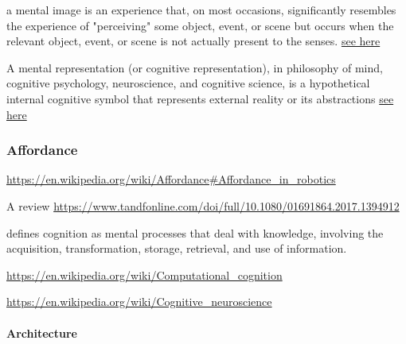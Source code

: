 \documentclass{book}
\newcommand{\seehere}[1]{\href{#1}{see here}}
\providecommand{\seehere}[1]{\href{#1}{see here}}
\begin{document}

a mental image is an experience that, on most occasions, significantly resembles the experience of "perceiving" some object, event, or scene but occurs when the relevant object, event, or scene is not actually present to the senses. \seehere{https://en.wikipedia.org/wiki/Mental_image}


A mental representation (or cognitive representation), in philosophy of mind, cognitive psychology, neuroscience, and cognitive science, is a hypothetical internal cognitive symbol that represents external reality or its abstractions \seehere{https://en.wikipedia.org/wiki/Mental_representation}

\subsubsection{Affordance}


\url{https://en.wikipedia.org/wiki/Affordance\#Affordance_in_robotics}
    
    A review
    \url{https://www.tandfonline.com/doi/full/10.1080/01691864.2017.1394912}


\cite{revlin-2012-cognition-theory-and-practice} defines cognition as mental processes that deal with knowledge, involving the acquisition, transformation, storage, retrieval, and use of information.


\url{https://en.wikipedia.org/wiki/Computational_cognition}
    


\url{https://en.wikipedia.org/wiki/Cognitive_neuroscience}
    

\paragraph{Architecture}

\end{document}
